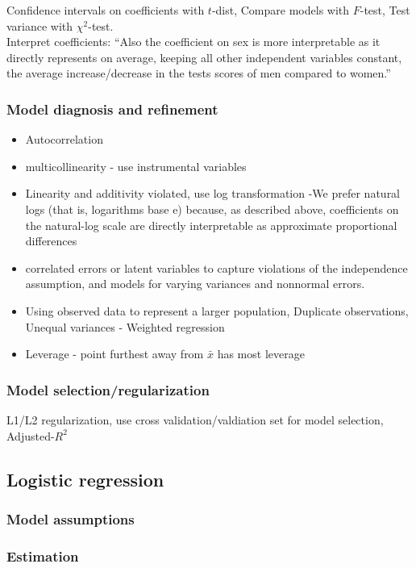 \documentclass{article}
\begin{document}
Confidence intervals on coefficients with $t$-dist,
Compare models with $F$-test,
Test variance with $\chi^2$-test.\\

Interpret coefficients: ``Also the coefficient on sex is more interpretable as it directly represents on average, keeping  all other independent variables constant, the average increase/decrease in the tests scores of men compared to women.''
\subsubsection{Model diagnosis and refinement}
\begin{itemize}
  \item Autocorrelation
  \item multicollinearity - use instrumental variables
  \item Linearity and additivity violated, use log transformation -We prefer natural logs (that is, logarithms base e) because, as described above, coefficients on the natural-log scale are directly interpretable as approximate proportional differences
  \item correlated errors or latent variables to capture violations of the independence assumption, and models for varying variances and nonnormal errors.
  \item Using observed data to represent a larger population, Duplicate observations, Unequal variances - Weighted regression
  \item Leverage - point furthest away from $\bar{x}$ has most leverage
\end{itemize}
\subsubsection{Model selection/regularization}
L1/L2 regularization, use cross validation/valdiation set for model selection, Adjusted-$R^2$

\subsection{Logistic regression}
\subsubsection{Model assumptions}
\subsubsection{Estimation}
\end{document}
